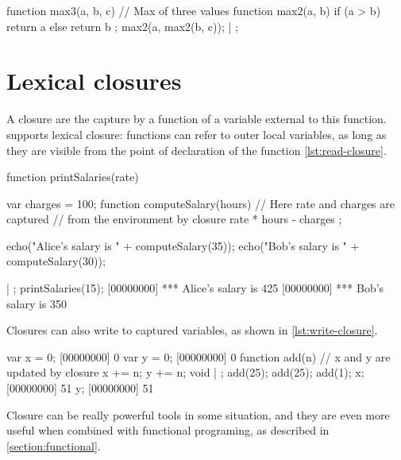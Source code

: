 \documentclass[openright,twoside,12pt]{report}
\begin{document}
\begin{urbiscript}[caption=Local helper function, label=lst:helper]
function max3(a, b, c) // Max of three values
{
  function max2(a, b)
  {
    if (a > b)
      return a
    else
      return b
  };
  max2(a, max2(b, c));
} | {};
\end{urbiscript}

\section{Lexical closures}

A closure are the capture by a function of a variable external to this
function. \urbi supports lexical closure: functions can refer to outer
local variables, as long as they are visible from the point of
declaration of the function \autoref{lst:read-closure}.

\begin{urbiscript}[caption=Capturing variables with lexical closures,
label=lst:read-closure]
function printSalaries(rate)
{
  var charges = 100;
  function computeSalary(hours)
  {
    // Here rate and charges are captured
    // from the environment by closure
    rate * hours - charges
  };

  echo("Alice's salary is " + computeSalary(35));
  echo("Bob's salary is " + computeSalary(30));
} | {};
printSalaries(15);
[00000000] *** Alice's salary is 425
[00000000] *** Bob's salary is 350
\end{urbiscript}

Closures can also write to captured variables, as shown in
\autoref{lst:write-closure}.

\begin{urbiscript}[caption=Updating captured variables,
label=lst:write-closure]
var x = 0;
[00000000] 0
var y = 0;
[00000000] 0
function add(n)
{
  // x and y are updated by closure
  x += n;
  y += n;
  void
} | {};
add(25);
add(25);
add(1);
x;
[00000000] 51
y;
[00000000] 51
\end{urbiscript}

Closure can be really powerful tools in some situation, and they are
even more useful when combined with functional programing, as
described in \autoref{section:functional}.

\end{document}
